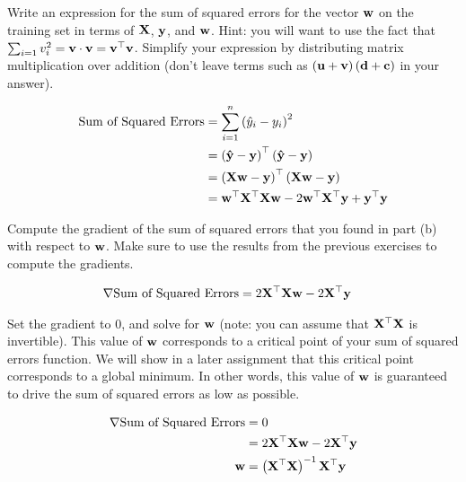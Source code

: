 \documentclass[assignment02_Solutions]{subfiles}
\begin{document}
\begin{exercise}[(40 minutes)]
\item Write an expression for the sum of squared errors for the vector $\mathbf{w}$ on the training set in terms of $\mathbf{X}$, $\mathbf{y}$, and $\mathbf{w}$.  Hint: you will want to use the fact that $\sum_{i=1} v_i^2 = \mathbf{v} \cdot \mathbf{v} = \mathbf{v}^\top \mathbf{v}$.  Simplify your expression by distributing matrix multiplication over addition (don't leave terms such as $\left (\mathbf{u} +\mathbf{v}  \right ) \left ( \mathbf{d} + \mathbf{c} \right)$ in your answer).
\begin{boxedsolution}
\begin{align}
\mbox{Sum of Squared Errors} &= \sum_{i=1}^n \left ( \hat{y}_i - y_i \right)^2 \\
&= \left (\mathbf{\hat y} - \mathbf{y} \right)^\top  \left (\mathbf{\hat y} - \mathbf{y} \right) \\
&=\left ( \mathbf{X} \mathbf{w} - \mathbf{y} \right)^\top  \left ( \mathbf{X} \mathbf{w} - \mathbf{y} \right) \\
&= \mathbf{w}^\top \mathbf{X}^\top \mathbf{X} \mathbf{w} - 2 \mathbf{w}^\top \mathbf{X}^\top \mathbf{y} + \mathbf{y}^\top \mathbf{y}
\end{align}
\end{boxedsolution}

\item Compute the gradient of the sum of squared errors that you found in part (b) with respect to $\mathbf{w}$.  Make sure to use the results from the previous exercises to compute the gradients.
\begin{boxedsolution}
\begin{align}
\nabla \mbox{Sum of Squared Errors}  &= 2 \mathbf{X}^\top \mathbf{X} \mathbf{w} - 2 \mathbf{X}^\top \mathbf{y}
\end{align}
\end{boxedsolution}

\item Set the gradient to 0, and solve for $\mathbf{w}$ (note: you can assume that $\mathbf{X}^\top \mathbf{X}$ is invertible).  This value of $\mathbf{w}$ corresponds to a critical point of your sum of squared errors function.  We will show in a later assignment that this critical point corresponds to a global minimum.  In other words, this value of $\mathbf{w}$ is guaranteed to drive the sum of squared errors as low as possible.

\begin{boxedsolution}
\begin{align}
\nabla \mbox{Sum of Squared Errors}  &= 0 \\
&= 2 \mathbf{X}^\top \mathbf{X} \mathbf{w} - 2 \mathbf{X}^\top \mathbf{y}\\
\mathbf{w} &= \left ( \mathbf{X}^\top \mathbf{X} \right )^{-1} \mathbf{X}^\top \mathbf{y}
\end{align}
\end{boxedsolution}

\ees
\end{exercise}
\end{document}
